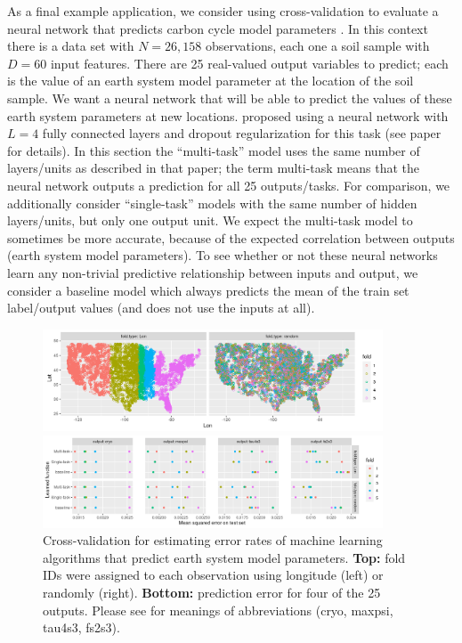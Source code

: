 \documentclass[12pt]{article}
\begin{document}
As a final example application, we consider using cross-validation to
evaluate a neural network that predicts carbon cycle model parameters
\citep{Feng2020}. In this context there is a data set with $N=26,158$
observations, each one a soil sample with $D=60$ input features.
There are 25 real-valued output variables to predict; each is the
value of an earth system model parameter at the location of the soil
sample. We want a neural network that will be able to predict the
values of these earth system parameters at new
locations. \citet{Feng2020} proposed using a neural network with $L=4$
fully connected layers and dropout regularization for this task (see
paper for details). In this section the ``multi-task'' model uses the
same number of layers/units as described in that paper; the term
multi-task means that the neural network outputs a prediction for all 25
outputs/tasks. For comparison, we additionally consider
``single-task'' models with the same number of hidden layers/units,
but only one output unit. We expect the multi-task model to sometimes
be more accurate, because of the expected correlation between outputs
(earth system model parameters). To see whether or not these neural
networks learn any non-trivial predictive relationship between inputs
and output, we consider a baseline model which always predicts the
mean of the train set label/output values (and does not use the inputs
at all).

\begin{figure}
  \centering
  \includegraphics[width=0.9\textwidth]{figure-proda-cv-data-map}

  \includegraphics[width=0.9\textwidth]{figure-proda-cv-some-out}
    \vskip -0.5cm
  \caption{Cross-validation for estimating error rates of machine
    learning algorithms that predict earth system model
    parameters. \textbf{Top:} fold IDs were assigned to each
    observation using longitude (left) or randomly
    (right). \textbf{Bottom:} prediction error for four of the 25
    outputs. Please see \citep{Feng2020} for meanings of abbreviations
    (cryo, maxpsi, tau4s3, fs2s3). }
  \label{fig:proda-cv}
\end{figure}
\end{document}
